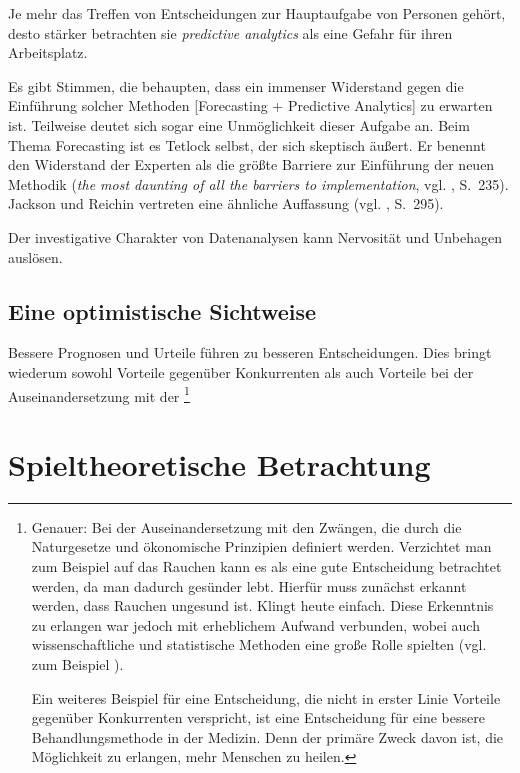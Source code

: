 Je mehr das Treffen von Entscheidungen zur Hauptaufgabe von Personen gehört,
desto stärker betrachten sie \emph{predictive analytics} als eine Gefahr für
ihren Arbeitsplatz.

Es gibt Stimmen, die behaupten, dass ein immenser Widerstand gegen die
Einführung solcher Methoden [Forecasting + Predictive Analytics] zu erwarten
ist. Teilweise deutet sich sogar eine Unmöglichkeit dieser Aufgabe an. Beim 
Thema Forecasting ist es Tetlock selbst, der sich skeptisch äußert. Er
benennt den Widerstand der Experten als die größte Barriere zur Einführung der
neuen Methodik (\emph{the most daunting of all the barriers to implementation},
vgl. \cite{Tetlock}, S.~235). Jackson und Reichin vertreten eine ähnliche
Auffassung (vgl. \cite{Jackson}, S.~295).

Der investigative Charakter von Datenanalysen kann Nervosität und Unbehagen
auslösen.

\subsection{Eine optimistische Sichtweise}


Bessere Prognosen und Urteile führen zu besseren Entscheidungen. Dies bringt
wiederum sowohl Vorteile gegenüber Konkurrenten als auch Vorteile bei der
Auseinandersetzung mit der \grqq\footnote{
Genauer: Bei der Auseinandersetzung mit den Zwängen, die durch die Naturgesetze
und ökonomische Prinzipien definiert werden. Verzichtet man zum Beispiel auf das 
Rauchen kann es als eine gute Entscheidung betrachtet werden, da man dadurch
gesünder lebt. Hierfür muss zunächst erkannt werden, dass Rauchen ungesund ist.
Klingt heute einfach. Diese Erkenntnis zu erlangen war jedoch mit erheblichem
Aufwand verbunden, wobei auch wissenschaftliche und statistische Methoden
eine große Rolle spielten (vgl. zum Beispiel \cite{Proctor}).

Ein weiteres Beispiel für eine Entscheidung, die nicht in erster Linie Vorteile
gegenüber Konkurrenten verspricht, ist eine Entscheidung für eine bessere
Behandlungsmethode in der Medizin. Denn der primäre Zweck davon ist, die 
Möglichkeit zu erlangen, mehr Menschen zu heilen.
}

\section{Spieltheoretische Betrachtung}

